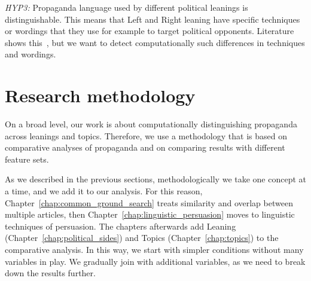 \emph{HYP3:} Propaganda language used by different political leanings is distinguishable. This means that Left and Right leaning have specific techniques or wordings that they use for example to target political opponents. Literature shows this~\citep{blumberg1986comparative}, but we want to detect computationally such differences in techniques and wordings.




\section{\statusgreen Research methodology}
\label{sec:intro_method}

On a broad level, our work is about computationally distinguishing propaganda across leanings and topics. Therefore, we use a methodology that is based on comparative analyses of propaganda and on comparing results with different feature sets.

As we described in the previous sections, methodologically we take one concept at a time, and we add it to our analysis. For this reason, Chapter~\ref{chap:common_ground_search} treats similarity and overlap between multiple articles, then Chapter~\ref{chap:linguistic_persuasion} moves to linguistic techniques of persuasion. The chapters afterwards add Leaning (Chapter~\ref{chap:political_sides}) and Topics (Chapter~\ref{chap:topics}) to the comparative analysis. In this way, we start with simpler conditions without many variables in play. We gradually join with additional variables, as we need to break down the results further.


